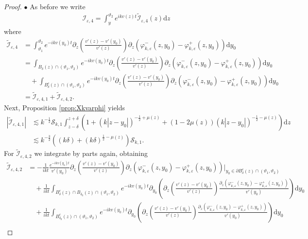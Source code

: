 \documentclass[10pt,a4paper]{amsart}
\newcommand\cI{{\mathcal I}}
\newcommand\cS{{\mathcal S}}
\newcommand{\bullpar}[1]{\vspace{.5em}\noindent $\bullet$ \normalfont {\bfseries #1.}}
\newcommand{\ep}{\varepsilon}
\renewcommand{\d}{\mathrm{d}}
\begin{document}
\begin{proof}
\bullpar{Estimates for $\cI_{\ep,4}$}
As before we write
\begin{align*}
\cI_{\ep,4} = \int_{y}^{\vartheta_2}e^{ikv(z)t} \widetilde\cI_{\ep,4}(z) \d z
\end{align*}
where 
\begin{align*}
\widetilde\cI_{\ep,4} &= \int_{\vartheta_1}^{\vartheta_2} e^{-ikv(y_0)t} \partial_z \left( \frac{v'(z) - v'(y_0)}{v'(z)} \right) \partial_z\left( \varphi_{k,\ep}^-(z,y_0) - \varphi_{k,\ep}^+(z,y_0) \right) \d y_0  \\
&=\int_{B_\delta(z)\cap(\vartheta_1,\vartheta_2)} e^{-ikv(y_0)t} \partial_z \left( \frac{v'(z) - v'(y_0)}{v'(z)} \right) \partial_z\left( \varphi_{k,\ep}^-(z,y_0) - \varphi_{k,\ep}^+(z,y_0) \right) \d y_0 \\
&\quad + \int_{B_\delta^c(z)\cap(\vartheta_1,\vartheta_2)} e^{-ikv(y_0)t} \partial_z \left( \frac{v'(z) - v'(y_0)}{v'(z)} \right) \partial_z\left( \varphi_{k,\ep}^-(z,y_0) - \varphi_{k,\ep}^+(z,y_0) \right) \d y_0  \\
&=\widetilde\cI_{\ep,4,1} + \widetilde\cI_{\ep,4,2}.
\end{align*}
Next, Proposition \ref{prop:Xkvarphi} yields
\begin{align*}
|\widetilde\cI_{\ep,4,1}| &\lesssim k^{-\frac12}\cS_{k,1} \int_{z-\delta}^{z+\delta} \left( 1 +  (k|z-y_0|)^{-\frac12+\mu(z)} + (1-2\mu(z))(k|z-y_0|)^{-\frac12-\mu(z)} \right) \d z \\
&\lesssim k^{-\frac32} \left( (k\delta) + (k\delta)^{\frac12-\mu(z)} \right)\cS_{k,1}.
\end{align*}
For $\widetilde\cI_{\ep,4,2}$ we integrate by parts again, obtaining
\begin{align*}
\widetilde\cI_{\ep,4,2} &= -\frac{1}{ikt} \frac{e^{-ikv(y_0)t}}{v'(y_0)}\partial_z \left( \frac{v'(z) - v'(y_0)}{v'(z)} \right) \partial_z\left( \varphi_{k,\ep}^-(z,y_0) - \varphi_{k,\ep}^+(z,y_0) \right) \Big|_{y_0\in \partial B_\delta^c(z)\cap (\vartheta_1,\vartheta_2)} \\
&\quad +\frac{1}{ikt} \int_{B_\delta^c(z)\cap B_{\delta_0}(z)\cap(\vartheta_1,\vartheta_2)}{e^{-ikv(y_0)t}} \partial_{y_0} \left( \partial_z \left( \frac{v'(z) - v'(y_0)}{v'(z)} \right) \frac{\partial_z\left( \varphi_{k,\ep}^-(z,y_0) - \varphi_{k,\ep}^+(z,y_0) \right)}{v'(y_0)} \right) \d y_0 \\
&\quad +\frac{1}{ikt} \int_{B_{\delta_0}^c(z)\cap(\vartheta_1,\vartheta_2)}{e^{-ikv(y_0)t}} \partial_{y_0} \left( \partial_z \left( \frac{v'(z) - v'(y_0)}{v'(z)} \right) \frac{\partial_z\left( \varphi_{k,\ep}^-(z,y_0) - \varphi_{k,\ep}^+(z,y_0) \right)}{v'(y_0)} \right) \d y_0 \\

\end{align*}
\end{proof}
\end{document}
